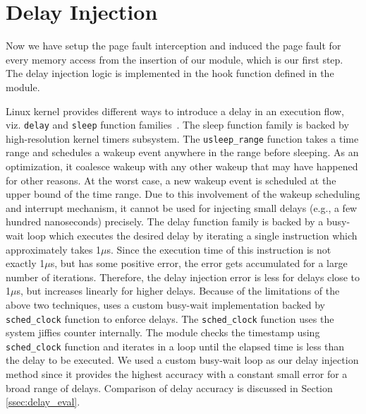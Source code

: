 \section{Delay Injection} \label{sec:delay_injection}
Now we have setup the page fault interception and induced the page fault for every memory access from the insertion of our module, which is our first step. The delay injection logic is implemented in the hook function defined in the module.

Linux kernel provides different ways to introduce a delay in an execution flow, viz. \verb|delay| and \verb|sleep| function families~\cite{timers}. The sleep function family is backed by high-resolution kernel timers subsystem. The \verb|usleep_range| function takes a time range and schedules a wakeup event anywhere in the range before sleeping. As an optimization, it coalesce wakeup with any other wakeup that may have happened for other reasons. At the worst case, a new wakeup event is scheduled at the upper bound of the time range. Due to this involvement of the wakeup scheduling and interrupt mechanism, it cannot be used for injecting small delays (e.g., a few hundred nanoseconds) precisely. The delay function family is backed by a busy-wait loop which executes the desired delay by iterating a single instruction which approximately takes 1$\mu$s. Since the execution time of this instruction is not exactly 1$\mu$s, but has some positive error, the error gets accumulated for a large number of iterations. Therefore, the delay injection error is less for delays close to 1$\mu$s, but increases linearly for higher delays. Because of the limitations of the above two techniques, {\dime} uses a custom busy-wait implementation backed by \verb|sched_clock| function to enforce delays. The \verb|sched_clock| function uses the system jiffies counter internally. The module checks the timestamp using \verb|sched_clock| function and iterates in a loop until the elapsed time is less than the delay to be executed. We used a custom busy-wait loop as our delay injection method since it provides the highest accuracy with a constant small error for a broad range of delays. Comparison of delay accuracy is discussed in Section \ref{ssec:delay_eval}.

